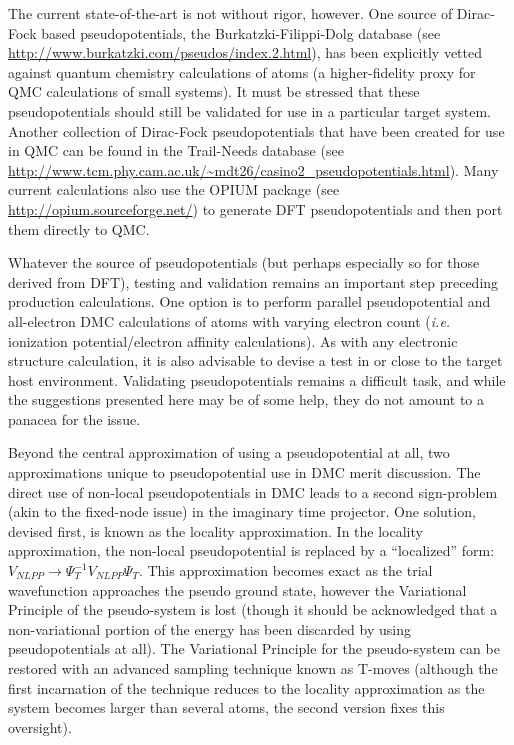 \documentclass[oneside,11pt]{memoir}
\numberwithin{equation}{section}
\begin{document}
The current state-of-the-art is not without rigor, however.  One source of 
Dirac-Fock based pseudopotentials, the Burkatzki-Filippi-Dolg database (see 
\url{http://www.burkatzki.com/pseudos/index.2.html}), has been explicitly 
vetted against quantum chemistry calculations of atoms (a higher-fidelity 
proxy for QMC calculations of small systems).  It must be stressed that 
these pseudopotentials should still be validated for use in a particular 
target system.  Another collection of Dirac-Fock pseudopotentials that have 
been created for use in QMC can be found in the Trail-Needs database 
(see \url{http://www.tcm.phy.cam.ac.uk/~mdt26/casino2_pseudopotentials.html}). 
Many current calculations also use the OPIUM package (see 
\url{http://opium.sourceforge.net/}) to generate DFT pseudopotentials and then 
port them directly to QMC.

Whatever the source of pseudopotentials (but perhaps especially so for those 
derived from DFT), testing and validation remains an important step preceding 
production calculations.  One option is to perform parallel pseudopotential 
and all-electron DMC calculations of atoms with varying electron count 
(\emph{i.e.} ionization potential/electron affinity calculations).  As with 
any electronic structure calculation, it is also advisable to devise a test 
in or close to the target host environment.
Validating pseudopotentials remains a difficult task, and while the suggestions 
presented here may be of some help, they do not amount to a panacea for the 
issue. 

Beyond the central approximation of using a pseudopotential at all, two 
approximations unique to pseudopotential use in DMC merit discussion.  The 
direct use of non-local pseudopotentials in DMC leads to a second sign-problem 
(akin to the fixed-node issue) in the imaginary time projector.  One solution, 
devised first, is known as the locality approximation.  In the locality 
approximation, the non-local pseudopotential is replaced by a ``localized'' 
form: $V_{NLPP}\rightarrow \Psi_T^{-1}V_{NLPP}\Psi_T$.  This approximation 
becomes exact as the trial wavefunction approaches the pseudo ground state, 
however the Variational Principle of the pseudo-system is lost (though it 
should be acknowledged that a non-variational portion of the energy has been 
discarded by using pseudopotentials at all).  The Variational Principle for 
the pseudo-system can be restored with an advanced sampling technique known 
as T-moves (although the first incarnation of the technique reduces to the 
locality approximation as the system becomes larger than several atoms, the 
second version fixes this oversight).
\end{document}
